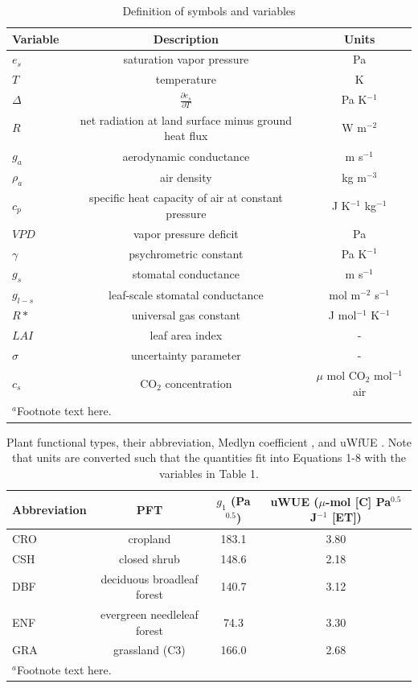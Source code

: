 \documentclass[draft,linenumbers]{agujournal}
\begin{document}
\begin{table}
\caption{Definition of symbols and variables}
\centering
\begin{tabular}{l c c}
\hline
 Variable & Description & Units  \\
\hline
$e_s$  & saturation vapor pressure & Pa  \\ 
$T$  & temperature  & K \\
$\Delta$  & $\frac{\partial e_s}{\partial T}$ & Pa K$^{-1}$ \\
$R$  & net radiation at land surface minus ground heat flux & W m$^{-2}$   \\
  $g_a$  & aerodynamic conductance & m s$^{-1}$  \\
  $\rho_a$  & air density & kg m$^{-3}$  \\
  $c_p$  & specific heat capacity of air at constant pressure & J K$^{-1}$ kg$^{-1}$ \\
  $VPD$  & vapor pressure deficit & Pa  \\
  $\gamma$  & psychrometric constant & Pa K$^{-1}$   \\
  $g_s$  & stomatal conductance & m s$^{-1}$  \\
  $g_{l-s}$  & leaf-scale stomatal conductance & mol m$^{-2}$ s$^{-1}$  \\
  $R*$ & universal gas constant & J mol$^{-1}$ K$^{-1}$ \\
  $LAI$ & leaf area index & -\\
  $\sigma$ & uncertainty parameter & -\\
  $c_s$ & CO$_2$ concentration & $\mu$ mol CO$_2$ mol$^{-1}$ air\\
\hline
\multicolumn{2}{l}{$^{a}$Footnote text here.}
\end{tabular}
\end{table}




\begin{table}
  \label{pft}
\caption{Plant functional types, their abbreviation, Medlyn coefficient \citep[from ][]{Lin_2015}, and uWfUE \citep[from ][]{Zhou_2015}. Note that units are converted such that the quantities fit into Equations 1-8 with the variables in Table 1.}
\centering
\begin{tabular}{l c c c}
  \hline
  Abbreviation & PFT & $g_1$ (Pa$^{0.5}$) & uWUE ($\mu$-mol [C] Pa$^{0.5}$ J$^{-1}$ [ET])  \\
  \hline
  CRO & cropland & 183.1 & 3.80 \\
  CSH & closed shrub & 148.6 & 2.18 \\
  DBF & deciduous broadleaf forest & 140.7 & 3.12 \\
  ENF & evergreen needleleaf forest & 74.3 & 3.30 \\
  GRA & grassland (C3) & 166.0 & 2.68 \\
\hline
\multicolumn{2}{l}{$^{a}$Footnote text here.}
\end{tabular}
\end{table}
\end{document}
